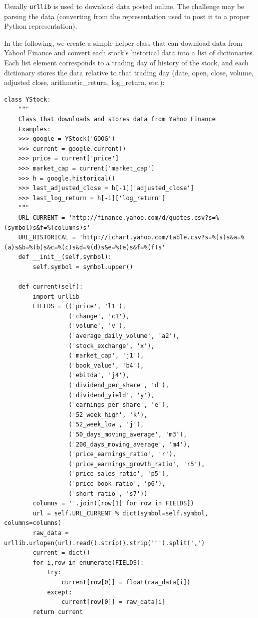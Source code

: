 \documentclass[justified,sixbynine]{tufte-book}
\def\ft{\small\tt}
\theoremstyle{plain}%
\theoremstyle{definition}
\theoremstyle{remark}
\begin{document}
\begin{fullwidth}

Usually {\ft urllib} is used to download data posted online. The challenge may be parsing the data (converting from the representation used to post it to a proper Python representation).

 In the following, we create a simple helper class that can download data from Yahoo! Finance and convert each stock's historical data into a list of dictionaries. Each list element corresponds to a trading day of history of the stock, and each dictionary stores the data relative to that trading day (date, open, close, volume, adjusted close, arithmetic\_return, log\_return, etc.):


\begin{lstlisting}[caption={in file: {\ft nlib.py}}]
class YStock:
    """
    Class that downloads and stores data from Yahoo Finance
    Examples:
    >>> google = YStock('GOOG')
    >>> current = google.current()
    >>> price = current['price']
    >>> market_cap = current['market_cap']
    >>> h = google.historical()
    >>> last_adjusted_close = h[-1]['adjusted_close']
    >>> last_log_return = h[-1]['log_return']
    """
    URL_CURRENT = 'http://finance.yahoo.com/d/quotes.csv?s=%(symbol)s&f=%(columns)s'
    URL_HISTORICAL = 'http://ichart.yahoo.com/table.csv?s=%(s)s&a=%(a)s&b=%(b)s&c=%(c)s&d=%(d)s&e=%(e)s&f=%(f)s'
    def __init__(self,symbol):
        self.symbol = symbol.upper()

    def current(self):
        import urllib
        FIELDS = (('price', 'l1'),
                  ('change', 'c1'),
                  ('volume', 'v'),
                  ('average_daily_volume', 'a2'),
                  ('stock_exchange', 'x'),
                  ('market_cap', 'j1'),
                  ('book_value', 'b4'),
                  ('ebitda', 'j4'),
                  ('dividend_per_share', 'd'),
                  ('dividend_yield', 'y'),
                  ('earnings_per_share', 'e'),
                  ('52_week_high', 'k'),
                  ('52_week_low', 'j'),
                  ('50_days_moving_average', 'm3'),
                  ('200_days_moving_average', 'm4'),
                  ('price_earnings_ratio', 'r'),
                  ('price_earnings_growth_ratio', 'r5'),
                  ('price_sales_ratio', 'p5'),
                  ('price_book_ratio', 'p6'),
                  ('short_ratio', 's7'))
        columns = ''.join([row[1] for row in FIELDS])
        url = self.URL_CURRENT % dict(symbol=self.symbol, columns=columns)
        raw_data = urllib.urlopen(url).read().strip().strip('"').split(',')
        current = dict()
        for i,row in enumerate(FIELDS):
            try:
                current[row[0]] = float(raw_data[i])
            except:
                current[row[0]] = raw_data[i]
        return current


\end{lstlisting}
\end{fullwidth}
\end{document}
